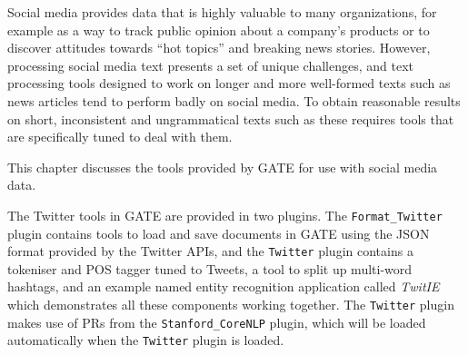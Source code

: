 %
%
%


\nnormalsize

Social media provides data that is highly valuable to many organizations, for
example as a way to track public opinion about a company's products or to
discover attitudes towards ``hot topics'' and breaking news stories.  However,
processing social media text presents a set of unique challenges, and text
processing tools designed to work on longer and more well-formed texts such as
news articles tend to perform badly on social media.  To obtain reasonable
results on short, inconsistent and ungrammatical texts such as these requires
tools that are specifically tuned to deal with them.

This chapter discusses the tools provided by GATE for use with social media
data.


The Twitter tools in GATE are provided in two plugins.  The
\verb!Format_Twitter! plugin contains tools to load and save documents in GATE
using the JSON format provided by the Twitter APIs, and the \verb!Twitter!
plugin contains a tokeniser and POS tagger tuned to Tweets, a tool to split
up multi-word hashtags, and an example named entity recognition application
called {\em TwitIE} which demonstrates all these components working together.
The \verb!Twitter! plugin makes use of PRs from the \verb!Stanford_CoreNLP!
plugin, which will be loaded automatically when the \verb!Twitter! plugin is
loaded.

